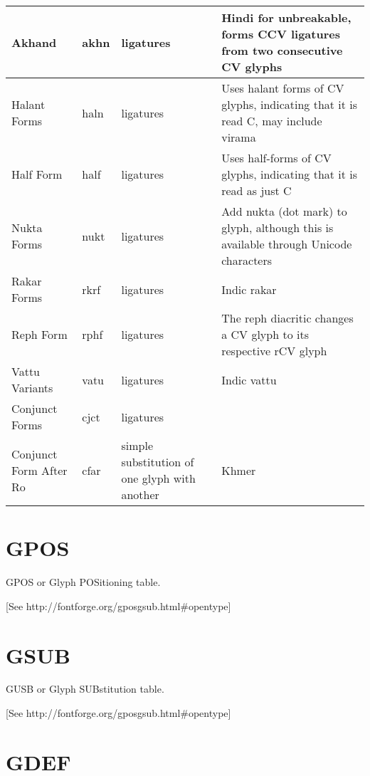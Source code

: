 \begin{center}
\begin{longtable}{ | p{2cm} | p{1cm} | p{3cm} | p{5cm} |}
Akhand                      & akhn & ligatures  & Hindi for unbreakable, forms CCV ligatures from two consecutive CV glyphs            \\\hline
Halant Forms                & haln & ligatures   & Uses halant forms of CV glyphs, indicating that it is read C, may include virama     \\\hline
Half Form                   & half & ligatures  & Uses half-forms of CV glyphs, indicating that it is read as just C                   \\\hline
Nukta Forms                 & nukt & ligatures & Add nukta (dot mark) to glyph, although this is available through Unicode characters \\\hline
Rakar Forms                 & rkrf & ligatures   & Indic rakar                                                                          \\\hline
Reph Form                   & rphf & ligatures & The reph diacritic changes a CV glyph to its respective rCV glyph                    \\\hline
Vattu Variants              & vatu & ligatures  & Indic vattu                                                                          \\\hline
Conjunct Forms              & cjct & ligatures  &                                                                                      \\\hline
Conjunct Form After Ro      & cfar & simple substitution of one glyph with another   & Khmer                                                                                \\\hline
\end{longtable}
\end{center}
\section{GPOS}

GPOS or Glyph POSitioning table.

[See http://fontforge.org/gposgsub.html\#opentype]

\section{GSUB}

GUSB or Glyph SUBstitution table.

[See http://fontforge.org/gposgsub.html\#opentype]

\section{GDEF}

